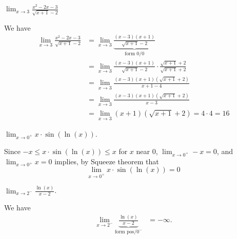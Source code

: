 \documentclass[nooutcomes]{ximera}
\renewenvironment{freeResponse}{
\ifhandout\setbox0\vbox\bgroup\else
\begin{trivlist}\item[\hskip \labelsep\bfseries Solution:\hspace{2ex}]
\fi}
{\ifhandout\egroup\else
\end{trivlist}
\fi}
\begin{document}
\begin{problem}
\begin{itemize}
    \item[(d)]
      $\displaystyle \lim_{x \to 3} \frac{x^2 - 2x - 3}{\sqrt{x+1} - 2}$
      \begin{freeResponse}
        We have
        \begin{align*}
          \lim_{x \to 3} \frac{x^2 - 2x - 3}{\sqrt{x+1} - 2} &= \lim_{x \to 3} \underbrace{\frac{(x- 3)(x + 1)}{\sqrt{x+1} - 2}}_\text{form $0/0$} \\
          &= \lim_{x \to 3} \frac{(x- 3)(x + 1)}{\sqrt{x+1} - 2} \cdot \frac{\sqrt{x+1} + 2}{\sqrt{x+1} + 2}\\
          &= \lim_{x \to 3} \frac{(x- 3)(x + 1)(\sqrt{x+1} + 2)}{x+1 - 4}\\
          &= \lim_{x \to 3} \frac{(x- 3)(x + 1)(\sqrt{x+1} + 2)}{x-3}\\
          &= \lim_{x \to 3} (x + 1)(\sqrt{x+1} + 2) = 4 \cdot 4 = 16
        \end{align*}
      \end{freeResponse}


    \item[(e)]
      $\displaystyle \lim_{x \to 0^+} x \cdot \sin(\ln(x))$.
      \begin{freeResponse}
        Since $-x \le x \cdot \sin(\ln(x)) \le x$ for $x$ near $0$, $\lim_{x \to 0^+} -x = 0$, and $\lim_{x \to 0^+} x = 0$ implies, by Squeeze theorem that
        \[
          \lim_{x \to 0^+} x \cdot \sin(\ln(x)) = 0
        \]
      \end{freeResponse}


    \item[(f)]
      $\displaystyle \lim_{x \to 2^-} \frac{\ln(x)}{x - 2}$.
      \begin{freeResponse}
        We have
        \begin{align*}
          \lim_{x \to 2^-} \underbrace{\frac{\ln(x)}{x - 2}}_\text{form $\text{pos}/0^-$} &= -\infty.
        \end{align*}
      \end{freeResponse}
  \end{itemize}  
\end{problem}
\end{document}
